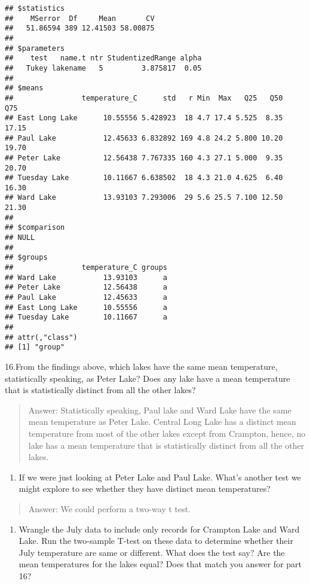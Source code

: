 \documentclass[
]{article}
\providecommand{\tightlist}{%
  \setlength{\itemsep}{0pt}\setlength{\parskip}{0pt}}
\begin{document}
\begin{verbatim}
## $statistics
##    MSerror  Df     Mean       CV
##   51.86594 389 12.41503 58.00875
## 
## $parameters
##    test   name.t ntr StudentizedRange alpha
##   Tukey lakename   5         3.875817  0.05
## 
## $means
##                temperature_C      std   r Min  Max   Q25   Q50   Q75
## East Long Lake      10.55556 5.428923  18 4.7 17.4 5.525  8.35 17.15
## Paul Lake           12.45633 6.832892 169 4.8 24.2 5.800 10.20 19.70
## Peter Lake          12.56438 7.767335 160 4.3 27.1 5.000  9.35 20.70
## Tuesday Lake        10.11667 6.638502  18 4.3 21.0 4.625  6.40 16.30
## Ward Lake           13.93103 7.293006  29 5.6 25.5 7.100 12.50 21.30
## 
## $comparison
## NULL
## 
## $groups
##                temperature_C groups
## Ward Lake           13.93103      a
## Peter Lake          12.56438      a
## Paul Lake           12.45633      a
## East Long Lake      10.55556      a
## Tuesday Lake        10.11667      a
## 
## attr(,"class")
## [1] "group"
\end{verbatim}

16.From the findings above, which lakes have the same mean temperature,
statistically speaking, as Peter Lake? Does any lake have a mean
temperature that is statistically distinct from all the other lakes?

\begin{quote}
Answer: Statistically speaking, Paul lake and Ward Lake have the same
mean temperature as Peter Lake. Central Long Lake has a distinct mean
temperature from most of the other lakes except from Crampton, hence, no
lake has a mean temperature that is statistically distinct from all the
other lakes.
\end{quote}

\begin{enumerate}
\def\labelenumi{\arabic{enumi}.}
\setcounter{enumi}{16}
\tightlist
\item
  If we were just looking at Peter Lake and Paul Lake. What's another
  test we might explore to see whether they have distinct mean
  temperatures?
\end{enumerate}

\begin{quote}
Answer: We could perform a two-way t test.
\end{quote}

\begin{enumerate}
\def\labelenumi{\arabic{enumi}.}
\setcounter{enumi}{17}
\tightlist
\item
  Wrangle the July data to include only records for Crampton Lake and
  Ward Lake. Run the two-sample T-test on these data to determine
  whether their July temperature are same or different. What does the
  test say? Are the mean temperatures for the lakes equal? Does that
  match you answer for part 16?
\end{enumerate}
\end{document}
